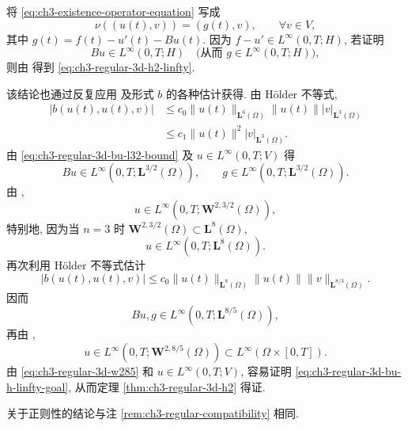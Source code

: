 \begin{Proof}
将 \eqref{eq:ch3-existence-operator-equation} 写成
\[
\nu((u(t),v))=(g(t),v),
\qquad\forall v\in V,
\]
其中 $g(t)=f(t)-u'(t)-Bu(t)$. 因为 $f-u'\in L^\infty(0,T;H)$, 若证明
\begin{equation}
Bu\in L^\infty(0,T;H)
\quad\text{(从而 }g\in L^\infty(0,T;H)\text{)},
\label{eq:ch3-regular-3d-bu-h-linfty-goal}
\end{equation}
则由  得到 \eqref{eq:ch3-regular-3d-h2-linfty}.

该结论也通过反复应用  及形式 $b$ 的各种估计获得. 由 Hölder 不等式,
\begin{equation}
\begin{aligned}
|b(u(t),u(t),v)|
&\leq c_0\lVert u(t)\rVert_{\mathbf L^6(\Omega)}\lVert u(t)\rVert
|v|_{\mathbf L^3(\Omega)}\\
&\leq c_1\lVert u(t)\rVert^2|v|_{\mathbf L^3(\Omega)}.
\end{aligned}
\label{eq:ch3-regular-3d-bu-l32-bound}
\end{equation}
由 \eqref{eq:ch3-regular-3d-bu-l32-bound} 及 $u\in L^\infty(0,T;V)$ 得
\[
Bu\in L^\infty(0,T;\mathbf L^{3/2}(\Omega)),
\qquad g\in L^\infty(0,T;\mathbf L^{3/2}(\Omega)).
\]
由 ,
\[
u\in L^\infty(0,T;\mathbf W^{2,3/2}(\Omega)),
\]
特别地, 因为当 $n=3$ 时 $\mathbf W^{2,3/2}(\Omega)\subset\mathbf L^8(\Omega)$,
\[
u\in L^\infty(0,T;\mathbf L^8(\Omega)).
\]
再次利用 Hölder 不等式估计
\[
|b(u(t),u(t),v)|
\leq c_0\lVert u(t)\rVert_{\mathbf L^8(\Omega)}
\lVert u(t)\rVert\lVert v\rVert_{\mathbf L^{8/3}(\Omega)}.
\]
因而
\[
Bu,g\in L^\infty(0,T;\mathbf L^{8/5}(\Omega)),
\]
再由 ,
\hypertarget{chapter-03-page-223}{}
\begin{equation}
u\in L^\infty(0,T;\mathbf W^{2,8/5}(\Omega))
\subset L^\infty(\Omega\times[0,T]).
\label{eq:ch3-regular-3d-w285}
\end{equation}
由 \eqref{eq:ch3-regular-3d-w285} 和 $u\in L^\infty(0,T;V)$, 容易证明 \eqref{eq:ch3-regular-3d-bu-h-linfty-goal}, 从而定理 \ref{thm:ch3-regular-3d-h2} 得证.
\end{Proof}

\begin{Remark}
\label{rem:ch3-regular-3d-compatibility}
关于正则性的结论与注 \ref{rem:ch3-regular-compatibility} 相同.
\end{Remark}

